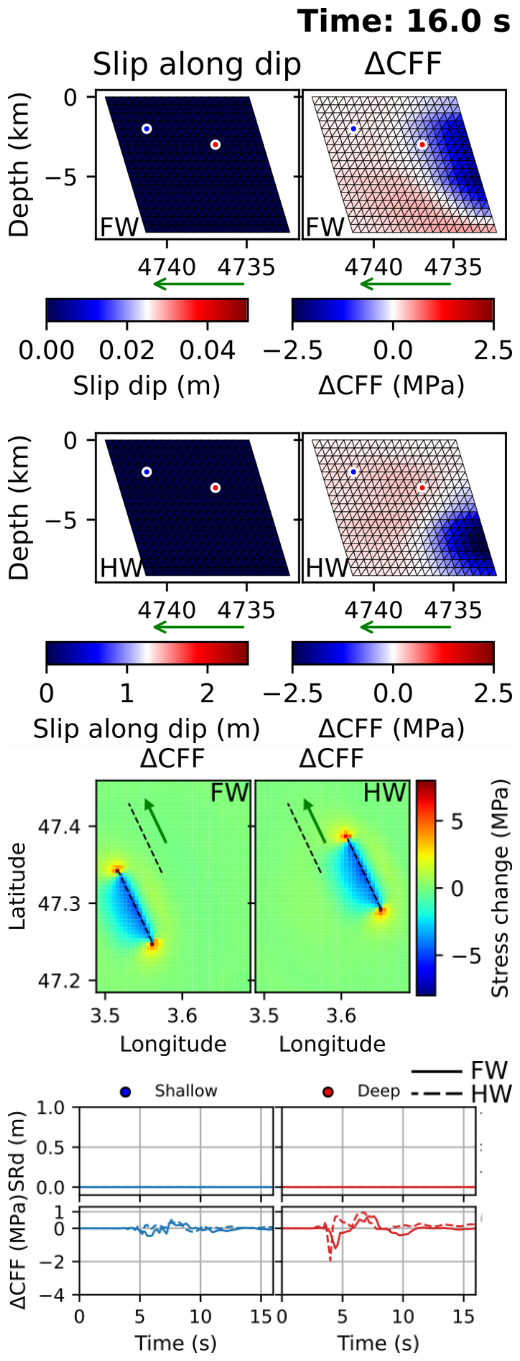 \begin{poster}
{\begin{minipage}{0.32\linewidth}
 \includegraphics[width=0.87\linewidth]{images/horizontal_delta_00080_fix_1.png}
\vskip 0.2cm
\vskip 0.2cm
\includegraphics[width=0.87\linewidth]{images/horizontal_delta_00080_fix_2.png} \\
\vskip 0.2cm
\vskip 0.2cm
\includegraphics[width=0.87\linewidth]{images/horizontal_delta_00080_fix_3.png} 
\end{minipage}
}


\end{poster}
